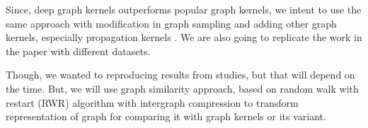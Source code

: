 \documentclass[12pt,a4paper]{article}
\numberwithin{equation}{section}
\numberwithin{figure}{section}
\numberwithin{table}{section}
\begin{document}
Since, \citep{Yanardag2015} deep graph kernels outperforms popular graph kernels, we intent to use the same approach with modification in graph sampling and adding other graph kernels, especially propagation kernels \citep{Neumann2015}. We are also going to replicate the work in the paper with different datasets.

Though, we wanted to reproducing results from \citet{Kondor2014} studies, but that will depend on the time. But, we will  use \citet{Lee2015} graph similarity approach, based on random walk with restart (RWR) algorithm with intergraph compression to transform representation of graph for comparing it with graph kernels or its variant.


\newpage
 

\end{document}

